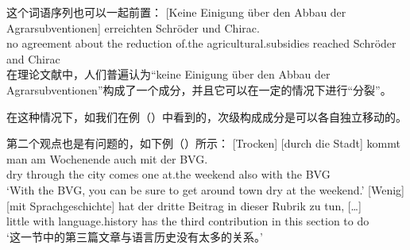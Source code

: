 这个词语序列也可以一起前置：
\ea
\gll {}[Keine Einigung über den Abbau der Agrarsubventionen] erreichten Schröder und Chirac.\\
     \spacebr{}no agreement about the reduction of.the agricultural.subsidies  reached Schröder and Chirac\\
\z
在理论文献中，人们普遍认为“keine Einigung über den Abbau der Agrarsubventionen”构成了一个成分，并且它可以在一定的情况下进行“分裂”。
\pagebreak

\noindent
在这种情况下，如我们在例（）中看到的，次级构成成分是可以各自独立移动的。\citep{deKuthy2002a} 

第二个观点也是有问题的，如下例（）所示：
\eal
\label{bsp-mehr-vf}
\ex\label{bsp-trocken-durch-die-stadt}
\gll {}[Trocken] [durch die Stadt] kommt man am Wochenende auch mit der BVG.\footnotemark\\
	 \spacebr{}dry \spacebr{}through the city comes one at.the weekend also with the BVG\\
\glt `With the BVG, you can be sure to get around town dry at the weekend.'
\ex 
\gll {}[Wenig] [mit Sprachgeschichte] hat der dritte Beitrag in dieser Rubrik zu tun, [\ldots]\footnotemark\\
       \spacebr{}little \spacebr{}with language.history has the third contribution in this section to do\\
\glt `这一节中的第三篇文章与语言历史没有太多的关系。'
\zl


